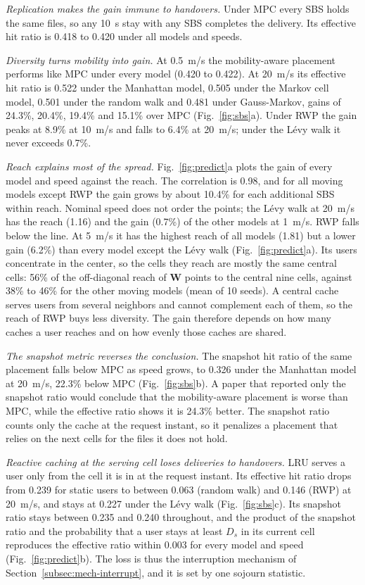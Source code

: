 \emph{Replication makes the gain immune to handovers.} Under MPC every SBS holds the same files, so any 10~s stay with any SBS completes the delivery. Its effective hit ratio is 0.418 to 0.420 under all models and speeds.

\emph{Diversity turns mobility into gain.} At 0.5~m/s the mobility-aware placement performs like MPC under every model (0.420 to 0.422). At 20~m/s its effective hit ratio is 0.522 under the Manhattan model, 0.505 under the Markov cell model, 0.501 under the random walk and 0.481 under Gauss-Markov, gains of 24.3\%, 20.4\%, 19.4\% and 15.1\% over MPC (Fig.~\ref{fig:sbs}a). Under RWP the gain peaks at 8.9\% at 10~m/s and falls to 6.4\% at 20~m/s; under the L\'evy walk it never exceeds 0.7\%.

\emph{Reach explains most of the spread.} Fig.~\ref{fig:predict}a plots the gain of every model and speed against the reach. The correlation is 0.98, and for all moving models except RWP the gain grows by about 10.4\% for each additional SBS within reach. Nominal speed does not order the points; the L\'evy walk at 20~m/s has the reach (1.16) and the gain (0.7\%) of the other models at 1~m/s. RWP falls below the line. At 5~m/s it has the highest reach of all models (1.81) but a lower gain (6.2\%) than every model except the L\'evy walk (Fig.~\ref{fig:predict}a). Its users concentrate in the center, so the cells they reach are mostly the same central cells: 56\% of the off-diagonal reach of $\mathbf{W}$ points to the central nine cells, against 38\% to 46\% for the other moving models (mean of 10 seeds). A central cache serves users from several neighbors and cannot complement each of them, so the reach of RWP buys less diversity. The gain therefore depends on how many caches a user reaches and on how evenly those caches are shared.

\emph{The snapshot metric reverses the conclusion.} The snapshot hit ratio of the same placement falls below MPC as speed grows, to 0.326 under the Manhattan model at 20~m/s, 22.3\% below MPC (Fig.~\ref{fig:sbs}b). A paper that reported only the snapshot ratio would conclude that the mobility-aware placement is worse than MPC, while the effective ratio shows it is 24.3\% better. The snapshot ratio counts only the cache at the request instant, so it penalizes a placement that relies on the next cells for the files it does not hold.

\emph{Reactive caching at the serving cell loses deliveries to handovers.} LRU serves a user only from the cell it is in at the request instant. Its effective hit ratio drops from 0.239 for static users to between 0.063 (random walk) and 0.146 (RWP) at 20~m/s, and stays at 0.227 under the L\'evy walk (Fig.~\ref{fig:sbs}c). Its snapshot ratio stays between 0.235 and 0.240 throughout, and the product of the snapshot ratio and the probability that a user stays at least $D_s$ in its current cell reproduces the effective ratio within 0.003 for every model and speed (Fig.~\ref{fig:predict}b). The loss is thus the interruption mechanism of Section~\ref{subsec:mech-interrupt}, and it is set by one sojourn statistic.

